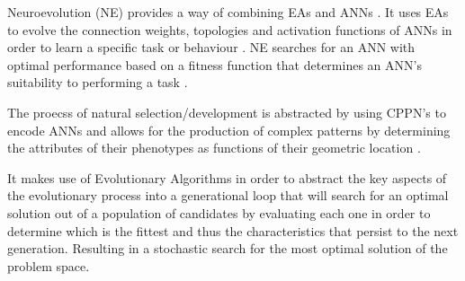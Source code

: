 


Neuroevolution (NE) provides a way of combining EAs and ANNs \cite{RefWorks:31}. It uses EAs to evolve the connection weights, topologies and activation functions of ANNs in order to learn a specific task or behaviour \cite{gomez1999solving}. NE searches for an ANN with optimal performance based on a fitness function that determines an ANN's suitability to performing a task \cite{RefWorks:31}.


The proecss of natural selection/development is abstracted by using CPPN's to encode ANNs and allows for the production of complex patterns by determining the attributes of their phenotypes as functions of their geometric location \cite{clune2011performance}.



It makes use of Evolutionary Algorithms in order to abstract the key aspects of the evolutionary process into a generational loop that will search for an optimal solution out of a population of candidates by evaluating each one in order to determine which is the fittest and thus the characteristics that persist to the next generation. Resulting in a stochastic search for the most optimal solution of the problem space.

